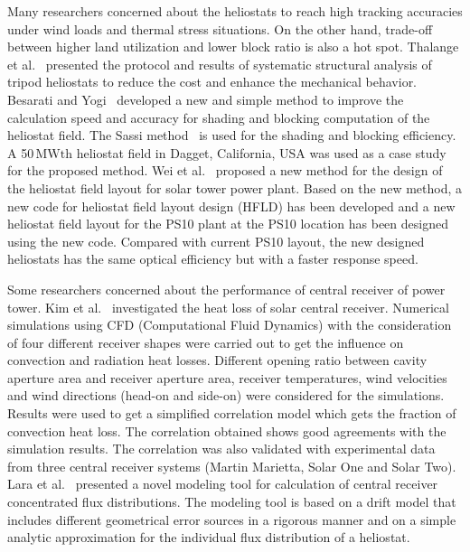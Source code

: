 Many researchers concerned about the heliostats to reach high tracking accuracies under wind loads and thermal stress situations. On the other hand, trade-off between higher land utilization and lower block ratio is also a hot spot.
Thalange et al.~\cite{Thalange2017} presented the protocol and results of systematic structural analysis of tripod heliostats to reduce the cost and enhance the mechanical behavior.
Besarati and Yogi~\cite{Besarati2014} developed a new and simple method to improve the calculation speed and accuracy for shading and blocking computation of the heliostat field. The Sassi method~\cite{Sassi1983} is used for the shading and blocking efficiency. A 50$\,\mathrm{MWth}$ heliostat field in Dagget, California, USA was used as a case study for the proposed method.
Wei et al.~\cite{Wei2010} proposed a new method for the design of the heliostat field layout for solar tower power plant. Based on the new method, a new code for heliostat field layout design (HFLD) has been developed and a new heliostat field layout for the PS10 plant at the PS10 location has been designed using the new code. Compared with current PS10 layout, the new designed heliostats has the same optical efficiency but with a faster response speed.

Some researchers concerned about the performance of central receiver of power tower.
Kim et al.~\cite{Kim2015} investigated the heat loss of solar central receiver. Numerical simulations using CFD (Computational Fluid Dynamics) with the consideration of four different receiver shapes were carried out to get the influence on convection and radiation heat losses. Different opening ratio between cavity aperture area and receiver aperture area, receiver temperatures, wind velocities and wind directions (head-on and side-on) were considered for the simulations. Results were used to get a simplified correlation model which gets the fraction of convection heat loss. The correlation obtained shows good agreements with the simulation results. The correlation was also validated with experimental data from three central receiver systems (Martin Marietta, Solar One and Solar Two).
Lara et al.~\cite{Lara2016} presented a novel modeling tool for calculation of central receiver concentrated flux distributions. The modeling tool is based on a drift model that includes different geometrical error sources in a rigorous manner and on a simple analytic approximation for the individual flux distribution of a heliostat. 

